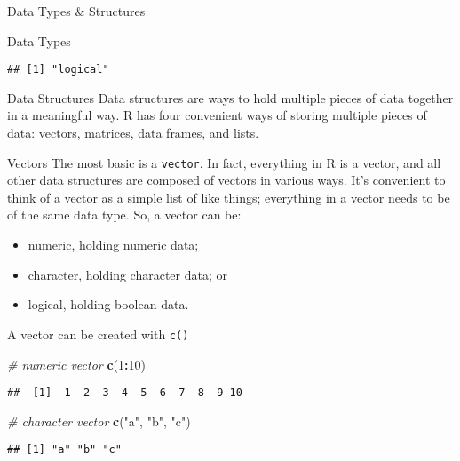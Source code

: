 \documentclass[
  ignorenonframetext,
]{beamer}
\newenvironment{Shaded}{\begin{snugshade}}{\end{snugshade}}
\newcommand{\CommentTok}[1]{\textcolor[rgb]{0.56,0.35,0.01}{\textit{#1}}}
\newcommand{\DecValTok}[1]{\textcolor[rgb]{0.00,0.00,0.81}{#1}}
\newcommand{\FunctionTok}[1]{\textcolor[rgb]{0.13,0.29,0.53}{\textbf{#1}}}
\newcommand{\NormalTok}[1]{#1}
\newcommand{\SpecialCharTok}[1]{\textcolor[rgb]{0.81,0.36,0.00}{\textbf{#1}}}
\newcommand{\StringTok}[1]{\textcolor[rgb]{0.31,0.60,0.02}{#1}}
\providecommand{\tightlist}{%
  \setlength{\itemsep}{0pt}\setlength{\parskip}{0pt}}
\begin{document}
\begin{frame}[fragile]{Data Types \& Structures}
\begin{block}{Data Types}
\begin{verbatim}
## [1] "logical"
\end{verbatim}
\end{block}

\begin{block}{Data Structures}
\protect\hypertarget{data-structures}{}
Data structures are ways to hold multiple pieces of data together in a
meaningful way. R has four convenient ways of storing multiple pieces of
data: vectors, matrices, data frames, and lists.

\begin{block}{Vectors}
\protect\hypertarget{vectors}{}
The most basic is a \texttt{vector}. In fact, everything in R is a
vector, and all other data structures are composed of vectors in various
ways. It's convenient to think of a vector as a simple list of like
things; everything in a vector needs to be of the same data type. So, a
vector can be:

\begin{itemize}
\tightlist
\item
  numeric, holding numeric data;
\item
  character, holding character data; or
\item
  logical, holding boolean data.
\end{itemize}

A vector can be created with \texttt{c()}

\begin{Shaded}
\begin{Highlighting}[]
\CommentTok{\# numeric vector}
\FunctionTok{c}\NormalTok{(}\DecValTok{1}\SpecialCharTok{:}\DecValTok{10}\NormalTok{)}
\end{Highlighting}
\end{Shaded}

\begin{verbatim}
##  [1]  1  2  3  4  5  6  7  8  9 10
\end{verbatim}

\begin{Shaded}
\begin{Highlighting}[]
\CommentTok{\# character vector}
\FunctionTok{c}\NormalTok{(}\StringTok{"a"}\NormalTok{, }\StringTok{"b"}\NormalTok{, }\StringTok{"c"}\NormalTok{)}
\end{Highlighting}
\end{Shaded}

\begin{verbatim}
## [1] "a" "b" "c"
\end{verbatim}


\end{block}
\end{block}
\end{frame}
\end{document}
